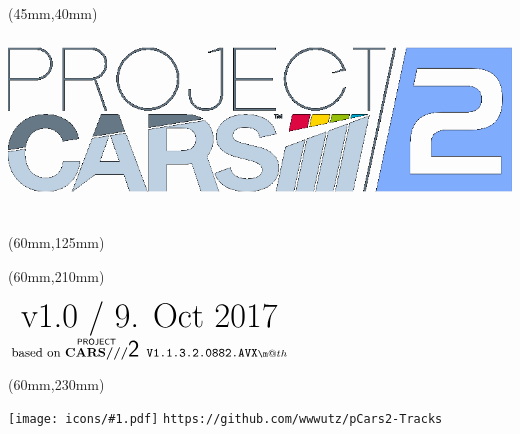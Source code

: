 \documentclass[oneside, a4paper, 12pt]{book}
\makeatletter
\newlength{\HT}
\newcommand*{\ICON}[2]{\settoheight{\HT}{\hbox{#2}}\mbox{\texttt{[image: icons/\#1.pdf]}}}
\newcommand*{\textatop}[2]{$\hbox{#1}\atop\hbox{#2}\m@th$}
\makeatother
\begin{document}
\selectfont
\textblockorigin{0cm}{0cm}

\newlength{\Logo}
\setlength{\Logo}{210mm-90mm}
\begin{textblock*}{\Logo}(45mm,40mm)%
\includegraphics[width=\Logo]{pcars2-main.png}
\end{textblock*}


\begin{textblock*}{30mm}(60mm,125mm)%
\end{textblock*}

\begin{textblock*}{90mm}(60mm,210mm)%
\begin{center}\textatop{\Huge{v1.0 / 9. Oct 2017}}{\small{based on $\stackrel{\text{\sffamily PROJECT}}{\text{\textbf{CARS///}}}$\LARGE{\sffamily 2}  \small\texttt{V1.1.3.2.0882.AVX}}}\end{center}
\end{textblock*}

\begin{textblock*}{90mm}(60mm,230mm)%
\begin{center}\ICON{fa-github}{X} \tt{https://github.com/wwwutz/pCars2-Tracks}\end{center}
\end{textblock*}


\null\newpage


\end{document}
